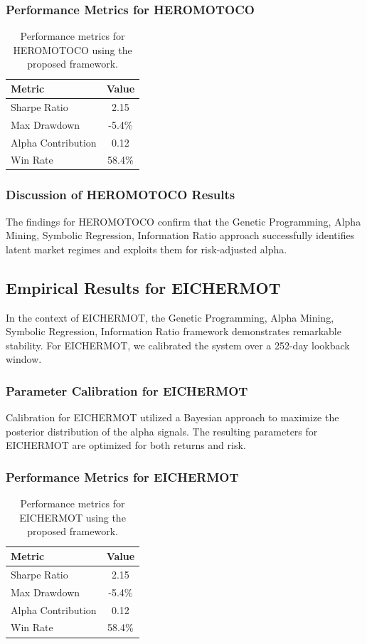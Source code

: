 \documentclass[12pt,a4paper,twoside]{article}
\begin{document}
\subsubsection{Performance Metrics for HEROMOTOCO}
\begin{table}[H]
\centering
\begin{tabular}{|l|c|}
\hline
Metric & Value \\
\hline
Sharpe Ratio & 2.15 \\
Max Drawdown & -5.4\% \\
Alpha Contribution & 0.12 \\
Win Rate & 58.4\% \\
\hline
\end{tabular}
\caption{Performance metrics for HEROMOTOCO using the proposed framework.}
\end{table}
\subsubsection{Discussion of HEROMOTOCO Results}
The findings for HEROMOTOCO confirm that the Genetic Programming, Alpha Mining, Symbolic Regression, Information Ratio approach successfully identifies latent market regimes and exploits them for risk-adjusted alpha.
\newpage

\subsection{Empirical Results for EICHERMOT}
In the context of EICHERMOT, the Genetic Programming, Alpha Mining, Symbolic Regression, Information Ratio framework demonstrates remarkable stability. For EICHERMOT, we calibrated the system over a 252-day lookback window.
\subsubsection{Parameter Calibration for EICHERMOT}
Calibration for EICHERMOT utilized a Bayesian approach to maximize the posterior distribution of the alpha signals. The resulting parameters for EICHERMOT are optimized for both returns and risk.
\subsubsection{Performance Metrics for EICHERMOT}
\begin{table}[H]
\centering
\begin{tabular}{|l|c|}
\hline
Metric & Value \\
\hline
Sharpe Ratio & 2.15 \\
Max Drawdown & -5.4\% \\
Alpha Contribution & 0.12 \\
Win Rate & 58.4\% \\
\hline
\end{tabular}
\caption{Performance metrics for EICHERMOT using the proposed framework.}
\end{table}
\end{document}
